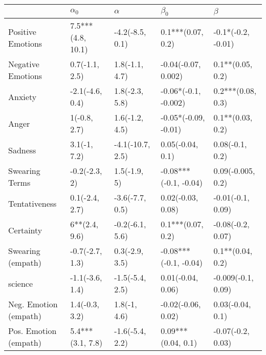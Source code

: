 \begin{tabular}{lllll}
\toprule
{} &         $\alpha_0$ &          $\alpha$ &              $\beta_0$ &             $\beta$ \\
\midrule
Positive Emotions     &  7.5***(4.8, 10.1) &   -4.2(-8.5, 0.1) &      0.1***(0.07, 0.2) &  -0.1*(-0.2, -0.01) \\
Negative Emotions     &     0.7(-1.1, 2.5) &    1.8(-1.1, 4.7) &    -0.04(-0.07, 0.002) &    0.1**(0.05, 0.2) \\
Anxiety               &    -2.1(-4.6, 0.4) &    1.8(-2.3, 5.8) &   -0.06*(-0.1, -0.002) &   0.2***(0.08, 0.3) \\
Anger                 &       1(-0.8, 2.7) &    1.6(-1.2, 4.5) &   -0.05*(-0.09, -0.01) &    0.1**(0.03, 0.2) \\
Sadness               &       3.1(-1, 7.2) &  -4.1(-10.7, 2.5) &       0.05(-0.04, 0.1) &     0.08(-0.1, 0.2) \\
Swearing Terms        &      -0.2(-2.3, 2) &      1.5(-1.9, 5) &  -0.08***(-0.1, -0.04) &   0.09(-0.005, 0.2) \\
Tentativeness         &     0.1(-2.4, 2.7) &   -3.6(-7.7, 0.5) &      0.02(-0.03, 0.08) &   -0.01(-0.1, 0.09) \\
Certainty             &      6**(2.4, 9.6) &   -0.2(-6.1, 5.6) &      0.1***(0.07, 0.2) &   -0.08(-0.2, 0.07) \\
Swearing (empath)     &    -0.7(-2.7, 1.3) &    0.3(-2.9, 3.5) &  -0.08***(-0.1, -0.04) &    0.1**(0.04, 0.2) \\
science               &    -1.1(-3.6, 1.4) &   -1.5(-5.4, 2.5) &      0.01(-0.04, 0.06) &  -0.009(-0.1, 0.09) \\
Neg. Emotion (empath) &     1.4(-0.3, 3.2) &      1.8(-1, 4.6) &     -0.02(-0.06, 0.02) &    0.03(-0.04, 0.1) \\
Pos. Emotion (empath) &   5.4***(3.1, 7.8) &   -1.6(-5.4, 2.2) &     0.09***(0.04, 0.1) &   -0.07(-0.2, 0.03) \\
\bottomrule
\end{tabular}
